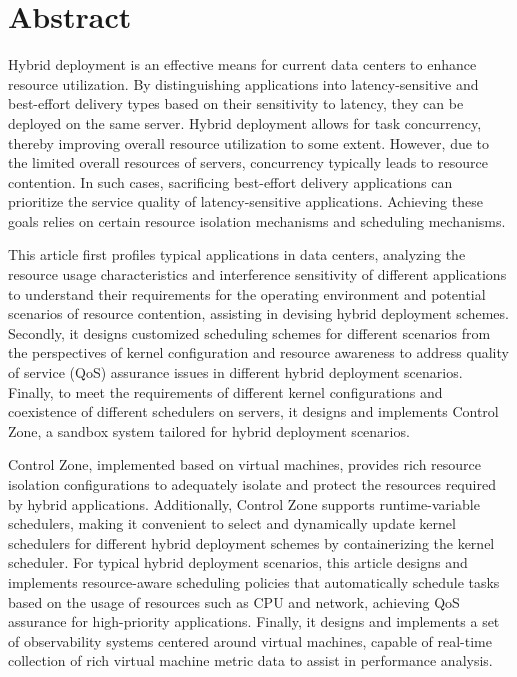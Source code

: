 \intobmk\chapter*{Abstract}%


Hybrid deployment is an effective means for current data centers to enhance resource utilization. By distinguishing applications into latency-sensitive and best-effort delivery types based on their sensitivity to latency, they can be deployed on the same server. Hybrid deployment allows for task concurrency, thereby improving overall resource utilization to some extent. However, due to the limited overall resources of servers, concurrency typically leads to resource contention. In such cases, sacrificing best-effort delivery applications can prioritize the service quality of latency-sensitive applications. Achieving these goals relies on certain resource isolation mechanisms and scheduling mechanisms.

This article first profiles typical applications in data centers, analyzing the resource usage characteristics and interference sensitivity of different applications to understand their requirements for the operating environment and potential scenarios of resource contention, assisting in devising hybrid deployment schemes. Secondly, it designs customized scheduling schemes for different scenarios from the perspectives of kernel configuration and resource awareness to address quality of service (QoS) assurance issues in different hybrid deployment scenarios. Finally, to meet the requirements of different kernel configurations and coexistence of different schedulers on servers, it designs and implements Control Zone, a sandbox system tailored for hybrid deployment scenarios.

Control Zone, implemented based on virtual machines, provides rich resource isolation configurations to adequately isolate and protect the resources required by hybrid applications. Additionally, Control Zone supports runtime-variable schedulers, making it convenient to select and dynamically update kernel schedulers for different hybrid deployment schemes by containerizing the kernel scheduler. For typical hybrid deployment scenarios, this article designs and implements resource-aware scheduling policies that automatically schedule tasks based on the usage of resources such as CPU and network, achieving QoS assurance for high-priority applications. Finally, it designs and implements a set of observability systems centered around virtual machines, capable of real-time collection of rich virtual machine metric data to assist in performance analysis.

